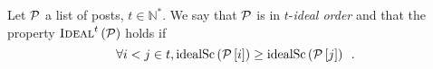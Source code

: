 \begin{definition}
  Let $\mathcal{P}$ a list of posts, $t \in \mathbb{N}^*$. We say that $\mathcal{P}$
  is in $t$-\emph{ideal order} and that the property
  $\textsc{Ideal}^{t}\left(\mathcal{P}\right)$ holds if
  \begin{equation*}
    \forall i < j \in t, \mathrm{idealSc}\left(\mathcal{P}\left[i\right]\right) \geq
    \mathrm{idealSc}\left(\mathcal{P}\left[j\right]\right) \enspace.
  \end{equation*}
\end{definition}
